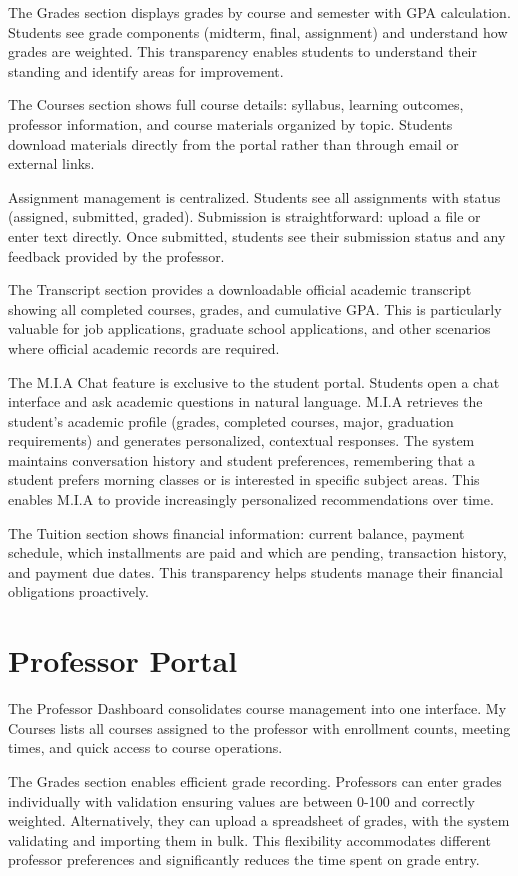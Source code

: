 \documentclass[12pt,a4paper]{report}
\begin{document}
The Grades section displays grades by course and semester with GPA calculation. Students see grade components (midterm, final, assignment) and understand how grades are weighted. This transparency enables students to understand their standing and identify areas for improvement.

The Courses section shows full course details: syllabus, learning outcomes, professor information, and course materials organized by topic. Students download materials directly from the portal rather than through email or external links.

Assignment management is centralized. Students see all assignments with status (assigned, submitted, graded). Submission is straightforward: upload a file or enter text directly. Once submitted, students see their submission status and any feedback provided by the professor.

The Transcript section provides a downloadable official academic transcript showing all completed courses, grades, and cumulative GPA. This is particularly valuable for job applications, graduate school applications, and other scenarios where official academic records are required.

The M.I.A Chat feature is exclusive to the student portal. Students open a chat interface and ask academic questions in natural language. M.I.A retrieves the student's academic profile (grades, completed courses, major, graduation requirements) and generates personalized, contextual responses. The system maintains conversation history and student preferences, remembering that a student prefers morning classes or is interested in specific subject areas. This enables M.I.A to provide increasingly personalized recommendations over time.

The Tuition section shows financial information: current balance, payment schedule, which installments are paid and which are pending, transaction history, and payment due dates. This transparency helps students manage their financial obligations proactively.

\section{Professor Portal}

The Professor Dashboard consolidates course management into one interface. My Courses lists all courses assigned to the professor with enrollment counts, meeting times, and quick access to course operations.

The Grades section enables efficient grade recording. Professors can enter grades individually with validation ensuring values are between 0-100 and correctly weighted. Alternatively, they can upload a spreadsheet of grades, with the system validating and importing them in bulk. This flexibility accommodates different professor preferences and significantly reduces the time spent on grade entry.
\end{document}
